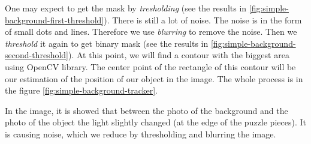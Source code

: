 One may expect to get the mask by \emph{tresholding} (see the results in
\ref{fig:simple-background-first-threshold}). There is still a lot of noise.
The noise is in the form of small dots and lines. Therefore we use
\emph{blurring} to remove the noise. Then we \emph{threshold} it again to get
binary mask (see the results in \ref{fig:simple-background-second-threshold}).
At this point, we will find a contour with the biggest area using OpenCV
library. The center point of the rectangle of this contour will be our
estimation of the position of our object in the image. The whole process is in
the figure \ref{fig:simple-background-tracker}.

In the image, it is showed that between the photo of the background and the photo
of the object the light slightly changed (at the edge of the puzzle pieces). It
is causing noise, which we reduce by thresholding and blurring the image.

